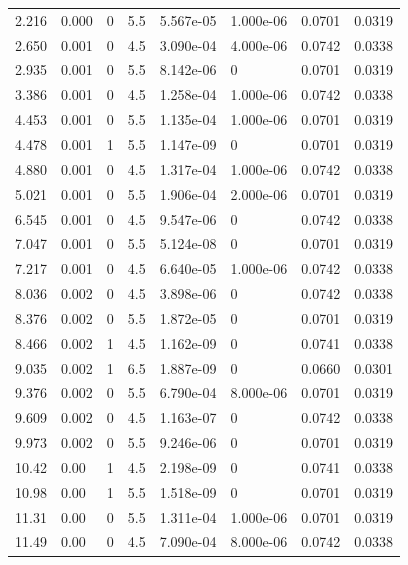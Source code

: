 \documentclass[preview]{standalone}
\begin{document}
{{\begin{tabular}{L{1.2cm}C{1.2cm} C{0.3cm}C{0.5cm} C{1.4cm}C{1.4cm} C{1.4cm}C{1.4cm}}
  2.216  &  0.000  & 0     & 5.5 &  5.567e-05  & 1.000e-06  & 0.0701 &  0.0319   \\ 
  2.650  &  0.001  & 0     & 4.5 &  3.090e-04  & 4.000e-06  & 0.0742 &  0.0338   \\ 
  2.935  &  0.001  & 0     & 5.5 &  8.142e-06  & 0  & 0.0701 &  0.0319   \\ 
  3.386  &  0.001  & 0     & 4.5 &  1.258e-04  & 1.000e-06  & 0.0742 &  0.0338   \\ 
  4.453  &  0.001  & 0     & 5.5 &  1.135e-04  & 1.000e-06  & 0.0701 &  0.0319   \\ 
  4.478  &  0.001  & 1     & 5.5 &  1.147e-09  & 0  & 0.0701 &  0.0319   \\ 
  4.880  &  0.001  & 0     & 4.5 &  1.317e-04  & 1.000e-06  & 0.0742 &  0.0338   \\ 
  5.021  &  0.001  & 0     & 5.5 &  1.906e-04  & 2.000e-06  & 0.0701 &  0.0319   \\ 
  6.545  &  0.001  & 0     & 4.5 &  9.547e-06  & 0  & 0.0742 &  0.0338   \\ 
  7.047  &  0.001  & 0     & 5.5 &  5.124e-08  & 0  & 0.0701 &  0.0319   \\ 
  7.217  &  0.001  & 0     & 4.5 &  6.640e-05  & 1.000e-06  & 0.0742 &  0.0338   \\ 
  8.036  &  0.002  & 0     & 4.5 &  3.898e-06  & 0  & 0.0742 &  0.0338   \\ 
  8.376  &  0.002  & 0     & 5.5 &  1.872e-05  & 0  & 0.0701 &  0.0319   \\ 
  8.466  &  0.002  & 1     & 4.5 &  1.162e-09  & 0  & 0.0741 &  0.0338   \\ 
  9.035  &  0.002  & 1     & 6.5 &  1.887e-09  & 0  & 0.0660 &  0.0301   \\ 
  9.376  &  0.002  & 0     & 5.5 &  6.790e-04  & 8.000e-06  & 0.0701 &  0.0319   \\ 
  9.609  &  0.002  & 0     & 4.5 &  1.163e-07  & 0  & 0.0742 &  0.0338   \\ 
  9.973  &  0.002  & 0     & 5.5 &  9.246e-06  & 0  & 0.0701 &  0.0319   \\ 
  10.42  &  0.00  & 1     & 4.5 &  2.198e-09  & 0  & 0.0741 &  0.0338   \\ 
  10.98  &  0.00  & 1     & 5.5 &  1.518e-09  & 0  & 0.0701 &  0.0319   \\ 
  11.31  &  0.00  & 0     & 5.5 &  1.311e-04  & 1.000e-06  & 0.0701 &  0.0319   \\ 
  11.49  &  0.00  & 0     & 4.5 &  7.090e-04  & 8.000e-06  & 0.0742 &  0.0338   \\ 

\end{tabular}}}
\end{document}
